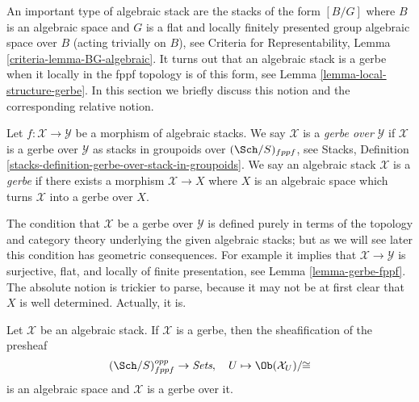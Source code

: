 \noindent
An important type of algebraic stack are the stacks of the
form $[B/G]$ where $B$ is an algebraic space and $G$ is a flat
and locally finitely presented group algebraic space over $B$
(acting trivially on $B$), see
Criteria for Representability, Lemma \ref{criteria-lemma-BG-algebraic}.
It turns out that an algebraic stack is a gerbe when it locally in the
fppf topology is of this form, see
Lemma \ref{lemma-local-structure-gerbe}.
In this section we briefly discuss this notion and the corresponding
relative notion.

\begin{definition}
\label{definition-gerbe}
Let $f : \mathcal{X} \to \mathcal{Y}$ be a morphism of algebraic stacks.
We say $\mathcal{X}$ is a {\it gerbe over} $\mathcal{Y}$ if
$\mathcal{X}$ is a gerbe over $\mathcal{Y}$ as stacks
in groupoids over $(\Sch/S)_{fppf}$, see
Stacks, Definition \ref{stacks-definition-gerbe-over-stack-in-groupoids}.
We say an algebraic stack $\mathcal{X}$ is a {\it gerbe} if there exists
a morphism $\mathcal{X} \to X$ where $X$ is an algebraic space which
turns $\mathcal{X}$ into a gerbe over $X$.
\end{definition}

\noindent
The condition that $\mathcal{X}$ be a gerbe over $\mathcal{Y}$ is defined
purely in terms of the topology and category theory underlying the given
algebraic stacks; but as we will see later this condition has
geometric consequences. For example it implies that
$\mathcal{X} \to \mathcal{Y}$ is surjective, flat, and
locally of finite presentation, see
Lemma \ref{lemma-gerbe-fppf}.
The absolute notion is trickier to parse, because it
may not be at first clear that $X$ is well determined. Actually, it is.

\begin{lemma}
\label{lemma-gerbe-over-iso-classes}
Let $\mathcal{X}$ be an algebraic stack. If $\mathcal{X}$ is a gerbe, then
the sheafification of the presheaf
$$
(\Sch/S)_{fppf}^{opp} \to \textit{Sets}, \quad
U \mapsto \Ob(\mathcal{X}_U)/\!\!\cong
$$
is an algebraic space and $\mathcal{X}$ is a gerbe over it.
\end{lemma}

